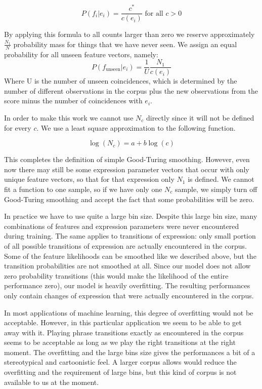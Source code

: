 \documentclass[a4paper,10pt]{article}
\begin{document}
\[P(f_i|e_i) = \frac{c^*}{c(e_i)} \mbox{ for all } c > 0 \]

By applying this formula to all counts larger than zero we reserve approximately $\frac{N_1}{N}$ probability mass for things that we have never seen. We assign an equal probability for all unseen feature vectors, namely:
\[
P(f_{\mbox{unseen}}|e_i) = \frac{1}{U} \frac{N_1}{c(e_i)} 
\]
Where U is the number of unseen coincidences, which is determined by the number of different observations in the corpus plus the new observations from the score minus the number of coincidences with $e_i$.

In order to make this work we cannot use $N_c$ directly since it will not be defined for every $c$. We use a least square approximation to the following function. 

\[\log(N_c) = a + b \log(c)\]

This completes the definition of simple Good-Turing smoothing. However, even now there may still be some expression parameter vectors that occur with only unique feature vectors, so that for that expression only $N_1$ is defined. We cannot fit a function to one sample, so if we have only one $N_c$ sample, we simply turn off Good-Turing smoothing and accept the fact that some probabilities will be zero. 

In practice we have to use quite a large bin size. Despite this large bin size, many combinations of features and expression parameters were never encountered during training. The same applies to transitions of expression: only small portion of all possible transitions of expression are actually encountered in the corpus. Some of the feature likelihoods can be smoothed like we described above, but the transition probabilities are not smoothed at all. Since our model does not allow zero probability transitions (this would make the likelihood of the entire performance zero), our model is heavily overfitting. The resulting performances only contain changes of expression that were actually encountered in the corpus.

In most applications of machine learning, this degree of overfitting would not be acceptable. However, in this particular application we seem to be able to get away with it. Playing phrase transitions exactly as encountered in the corpus seems to be acceptable as long as we play the right transitions at the right moment. The overfitting and the large bins size gives the performances a bit of a stereotypical and cartoonistic feel. A larger corpus allows would reduce the overfitting and the requirement of large bins, but this kind of corpus is not available to us at the moment.
\end{document}
